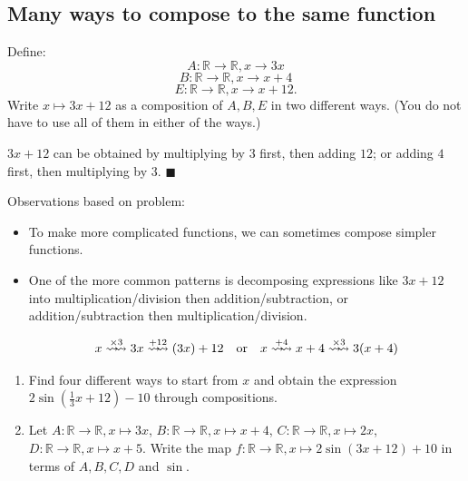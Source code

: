 \documentclass[11pt]{article}
\newenvironment{task}
	{\begin{mdframed}[linecolor=lightgray, linewidth=3pt]\raggedright}
	{\end{mdframed}}
\newcommand\tn{\textnormal}
\newcommand{\R}{\mathbb{R}}
\theoremstyle{definition}
\newenvironment{solution}{{\it Solution.} }{\hfill {\color{lightgray}$\blacksquare$}}
\begin{document}
\newpage
\subsection{Many ways to compose to the same function}


\begin{task}
Define:
$$A:\R\to \R, x\to 3x$$
$$B:\R\to \R, x\to x+4$$
$$E:\R\to\R, x\to x+12.$$
Write $x\mapsto 3x+12$ as a composition of $A, B, E$ in two different ways. (You do not have to use all of them in either of the ways.)
\end{task} 

\begin{solution}
$3x+12$ can be obtained by multiplying by $3$ first, then adding $12$; or adding $4$ first, then multiplying by $3$. 
\end{solution}

Observations based on problem:

\begin{itemize}
\item To make more complicated functions, we can sometimes compose simpler functions.
\item One of the more common patterns is decomposing expressions like $3x+12$ into multiplication/division then addition/subtraction, or addition/subtraction then multiplication/division.


	$$x \stackrel{\times 3}{\rightsquigarrow\!\!\rightsquigarrow} 3x \stackrel{+12}{\rightsquigarrow\!\!\rightsquigarrow}  (3x)+12 \tn{\quad or\quad} x \stackrel{+4}{\rightsquigarrow\!\!\rightsquigarrow}  x+4 \stackrel{\times 3}{\rightsquigarrow\!\!\rightsquigarrow} 3(x+4)$$  
\end{itemize}

\vspace*{-3pt}
\begin{task}

\begin{enumerate}
\item Find four different ways to start from $x$ and obtain the expression $2\sin(\frac{1}{3}x+12)-10$ through compositions.
\item Let
	$A:\R\to\R, x\mapsto 3x$, \quad $B:\R\to \R, x\mapsto x+4$, \quad $C:\R\to \R,x\mapsto 2x$, \quad$D:\R\to \R,x\mapsto x+5$. Write the map $f:\R\to\R, x\mapsto 2\sin(3x+12)+10$ in terms of $A, B, C, D$ and $\sin$. 
\end{enumerate}
\end{task}
\end{document}
